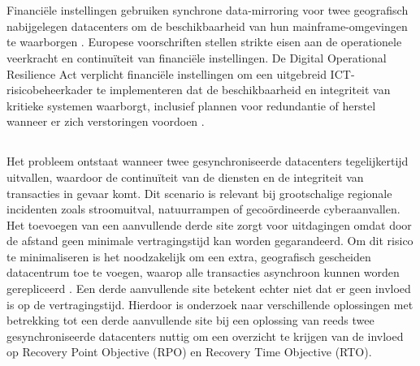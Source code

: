 
\chapter{}%
\label{ch:inleiding}

Financiële instellingen gebruiken synchrone data-mirroring voor twee geografisch nabijgelegen datacenters om de beschikbaarheid van hun mainframe-omgevingen te waarborgen \autocite{bourbonnais2015}. 
Europese voorschriften stellen strikte eisen aan de operationele veerkracht en continuïteit van financiële instellingen.
De Digital Operational Resilience Act verplicht financiële instellingen om een uitgebreid ICT-risico\-beheer\-kader te implementeren dat de beschikbaarheid en integriteit van kritieke systemen waarborgt, inclusief plannen voor redundantie of herstel wanneer er zich verstoringen voordoen \autocite{clausmeier2023regulation}. 

\section{}%
\label{sec:probleemstelling}

Het probleem ontstaat wanneer twee gesynchroniseerde datacenters tegelijkertijd uitvallen, waardoor de continuïteit van de diensten en de integriteit van transacties in gevaar komt. 
Dit scenario is relevant bij grootschalige regionale incidenten zoals stroomuitval, natuurrampen of gecoördineerde cyberaanvallen.
Het toevoegen van een aanvullende derde site zorgt voor uitdagingen omdat door de afstand geen minimale vertragingstijd kan worden gegarandeerd.
Om dit risico te minimaliseren is het noodzakelijk om een extra, geografisch gescheiden datacentrum toe te voegen, waarop alle transacties asynchroon kunnen worden gerepliceerd \autocite{snedaker2013business}.
Een derde aanvullende site betekent echter niet dat er geen invloed is op de vertragingstijd.
Hierdoor is onderzoek naar verschillende oplossingen met betrekking tot een derde aanvullende site bij een oplossing van reeds twee gesynchroniseerde datacenters nuttig om een overzicht te krijgen van de invloed op Recovery Point Objective (RPO) en Recovery Time Objective (RTO).

